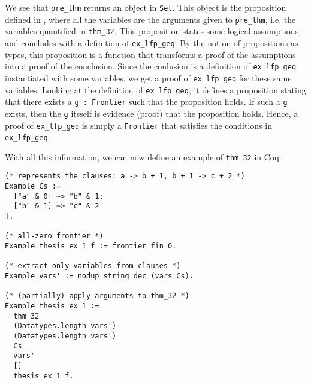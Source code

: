 We see that \lstinline{pre_thm} returns an object in \lstinline{Set}.
This object is the proposition defined in ,
where all the variables are the arguments given to \lstinline{pre_thm}, i.e. the variables quantified in \lstinline{thm_32}.
This proposition states some logical assumptions, and concludes with a definition of \lstinline{ex_lfp_geq}.
By the notion of propositions as types, this proposition is a function
that transforms a proof of the assumptions into a proof of the conclusion.
Since the conlusion is a definition of \lstinline{ex_lfp_geq} instantiated with some variables,
we get a proof of \lstinline{ex_lfp_geq} for these same variables.
Looking at the definition of \lstinline{ex_lfp_geq},
it defines a proposition stating that there exists a \lstinline{g : Frontier} such that the proposition holds.
If such a \lstinline{g} exists, then the \lstinline{g} itsself is evidence (proof) that the proposition holds.
Hence, a proof of \lstinline{ex_lfp_geq} is simply a \lstinline{Frontier} that satisfies the conditions in \lstinline{ex_lfp_geq}.

With all this information, we can now define an example of \lstinline{thm_32} in Coq.

\begin{minipage}{\linewidth}
\begin{lstlisting}[language=Coq, label={lst:thm_32_coq_example}, caption={\lstinline{thm_32} example}]
(* represents the clauses: a -> b + 1, b + 1 -> c + 2 *)
Example Cs := [
  ["a" & 0] ~> "b" & 1;
  ["b" & 1] ~> "c" & 2
].

(* all-zero frontier *)
Example thesis_ex_1_f := frontier_fin_0.

(* extract only variables from clauses *)
Example vars' := nodup string_dec (vars Cs).

(* (partially) apply arguments to thm_32 *)
Example thesis_ex_1 :=
  thm_32
  (Datatypes.length vars')
  (Datatypes.length vars')
  Cs
  vars'
  []
  thesis_ex_1_f.
\end{lstlisting}
\end{minipage}

